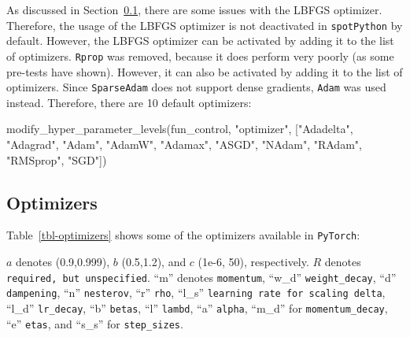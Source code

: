 \documentclass[
  letterpaper,
  DIV=11,
  numbers=noendperiod]{scrreprt}
\newenvironment{Shaded}{\begin{snugshade}}{\end{snugshade}}
\newcommand{\NormalTok}[1]{\textcolor[rgb]{0.00,0.23,0.31}{#1}}
\newcommand{\StringTok}[1]{\textcolor[rgb]{0.13,0.47,0.30}{#1}}
\begin{document}
As discussed in Section~\ref{sec-optimizers-14}, there are some issues
with the LBFGS optimizer. Therefore, the usage of the LBFGS optimizer is
not deactivated in \texttt{spotPython} by default. However, the LBFGS
optimizer can be activated by adding it to the list of optimizers.
\texttt{Rprop} was removed, because it does perform very poorly (as some
pre-tests have shown). However, it can also be activated by adding it to
the list of optimizers. Since \texttt{SparseAdam} does not support dense
gradients, \texttt{Adam} was used instead. Therefore, there are 10
default optimizers:

\begin{Shaded}
\begin{Highlighting}[]
\NormalTok{modify\_hyper\_parameter\_levels(fun\_control, }\StringTok{"optimizer"}\NormalTok{,}
\NormalTok{    [}\StringTok{"Adadelta"}\NormalTok{, }\StringTok{"Adagrad"}\NormalTok{, }\StringTok{"Adam"}\NormalTok{, }\StringTok{"AdamW"}\NormalTok{, }\StringTok{"Adamax"}\NormalTok{, }\StringTok{"ASGD"}\NormalTok{, }
    \StringTok{"NAdam"}\NormalTok{, }\StringTok{"RAdam"}\NormalTok{, }\StringTok{"RMSprop"}\NormalTok{, }\StringTok{"SGD"}\NormalTok{])}
\end{Highlighting}
\end{Shaded}

\hypertarget{sec-optimizers-14}{%
\subsection{Optimizers}\label{sec-optimizers-14}}

Table~\ref{tbl-optimizers} shows some of the optimizers available in
\texttt{PyTorch}:

\(a\) denotes (0.9,0.999), \(b\) (0.5,1.2), and \(c\) (1e-6, 50),
respectively. \(R\) denotes \texttt{required,\ but\ unspecified}. ``m''
denotes \texttt{momentum}, ``w\_d'' \texttt{weight\_decay}, ``d''
\texttt{dampening}, ``n'' \texttt{nesterov}, ``r'' \texttt{rho},
``l\_s'' \texttt{learning\ rate\ for\ scaling\ delta}, ``l\_d''
\texttt{lr\_decay}, ``b'' \texttt{betas}, ``l'' \texttt{lambd}, ``a''
\texttt{alpha}, ``m\_d'' for \texttt{momentum\_decay}, ``e''
\texttt{etas}, and ``s\_s'' for \texttt{step\_sizes}.
\end{document}
